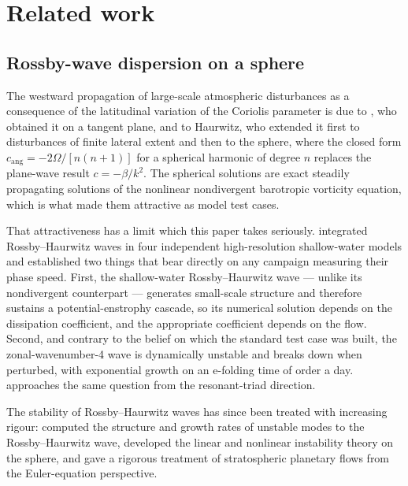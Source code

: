 %
%

\section{Related work}
\label{sec:related}

\subsection{Rossby-wave dispersion on a sphere}

The westward propagation of large-scale atmospheric disturbances as a consequence
of the latitudinal variation of the Coriolis parameter is due to
\citet{rossby1939}, who obtained it on a tangent plane, and to Haurwitz, who
extended it first to disturbances of finite lateral extent and then to the sphere,
where the closed form $c_{\mathrm{ang}} = -2\Omega/[n(n+1)]$ for a spherical
harmonic of degree $n$ replaces the plane-wave result $c = -\beta/k^2$. The
spherical solutions are exact steadily propagating solutions of the nonlinear
nondivergent barotropic vorticity equation, which is what made them attractive as
model test cases.

That attractiveness has a limit which this paper takes seriously.
\citet{thuburn2000} integrated Rossby--Haurwitz waves in four independent
high-resolution shallow-water models and established two things that bear directly
on any campaign measuring their phase speed. First, the shallow-water
Rossby--Haurwitz wave --- unlike its nondivergent counterpart --- generates
small-scale structure and therefore sustains a potential-enstrophy cascade, so its
numerical solution depends on the dissipation coefficient, and the appropriate
coefficient depends on the flow. Second, and contrary to the belief on which the
standard test case was built, the zonal-wavenumber-4 wave is dynamically unstable
and breaks down when perturbed, with exponential growth on an e-folding time of
order a day. \citet{lynch2009} approaches the same question from the resonant-triad
direction.

The stability of Rossby--Haurwitz waves has since been treated with increasing
rigour: \citet{skiba2004} computed the structure and growth rates of unstable modes
to the Rossby--Haurwitz wave, \citet{skiba2008,skiba2024} developed the linear and
nonlinear instability theory on the sphere, and \citet{constantin2022} gave a
rigorous treatment of stratospheric planetary flows from the Euler-equation
perspective.

